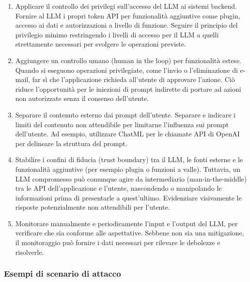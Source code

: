 \documentclass[
]{article}
\providecommand{\tightlist}{%
  \setlength{\itemsep}{0pt}\setlength{\parskip}{0pt}}
\begin{document}
\begin{enumerate}
\def\labelenumi{\arabic{enumi}.}
\tightlist
\item
  Applicare il controllo dei privilegi sull'accesso del LLM ai sistemi
  backend. Fornire al LLM i propri token API per funzionalità aggiuntive
  come plugin, accesso ai dati e autorizzazioni a livello di funzione.
  Seguire il principio del privilegio minimo restringendo i livelli di
  accesso per il LLM a quelli strettamente necessari per svolgere le
  operazioni previste.
\item
  Aggiungere un controllo umano (human in the loop) per funzionalità
  estese. Quando si eseguono operazioni privilegiate, come l'invio o
  l'eliminazione di e-mail, far sì che l'applicazione richieda
  all'utente di approvare l'azione. Ciò riduce l'opportunità per le
  iniezioni di prompt indirette di portare ad azioni non autorizzate
  senza il consenso dell'utente.
\item
  Separare il contenuto esterno dai prompt dell'utente. Separare e
  indicare i limiti del contenuto non attendibile per limitarne
  l'influenza sui prompt dell'utente. Ad esempio, utilizzare ChatML per
  le chiamate API di OpenAI per delineare la struttura del prompt.
\item
  Stabilire i confini di fiducia (trust boundary) tra il LLM, le fonti
  esterne e le funzionalità aggiuntive (per esempio plugin o funzioni a
  valle). Tuttavia, un LLM compromesso può comunque agire da
  intermediario (man-in-the-middle) tra le API dell'applicazione e
  l'utente, nascondendo o manipolando le informazioni prima di
  presentarle a quest'ultimo. Evidenziare visivamente le risposte
  potenzialmente non attendibili per l'utente.
\item
  Monitorare manualmente e periodicamente l'input e l'output del LLM,
  per verificare che sia conforme alle aspettative. Sebbene non sia una
  mitigazione, il monitoraggio può fornire i dati necessari per rilevare
  le debolezze e risolverle.
\end{enumerate}

\subsubsection{Esempi di scenario di
attacco}\label{esempi-di-scenario-di-attacco}
\end{document}
